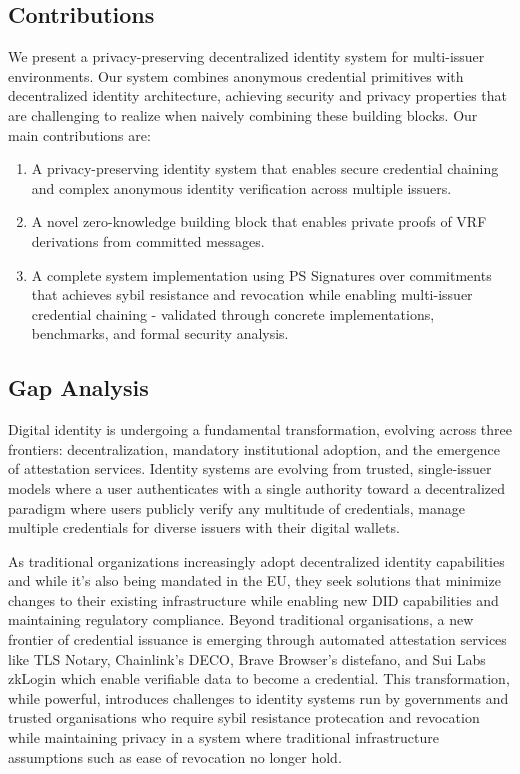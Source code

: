 \newpage

\subsection{Contributions}

We present a privacy-preserving decentralized identity system for multi-issuer environments. Our system combines anonymous credential primitives with decentralized identity architecture, achieving security and privacy properties that are challenging to realize when naively combining these building blocks. Our main contributions are:

\begin{enumerate}
    
    \item  A privacy-preserving identity system that enables secure credential chaining and complex anonymous identity verification across multiple issuers.

    \item A novel zero-knowledge building block that enables private proofs of VRF derivations from committed messages.
    
    \item  A complete system implementation using PS Signatures over commitments that achieves sybil resistance and revocation while enabling multi-issuer credential chaining - validated through concrete implementations, benchmarks, and formal security analysis.

\end{enumerate}

\subsection{Gap Analysis}

Digital identity is undergoing a fundamental transformation, evolving across three frontiers: decentralization, mandatory institutional adoption, and the emergence of attestation services.    
Identity systems are evolving from trusted, single-issuer models where a user authenticates with a single authority toward a decentralized paradigm where users publicly verify any multitude of credentials, manage multiple credentials for diverse issuers with their digital wallets.

\noindent As traditional organizations increasingly adopt decentralized identity capabilities and while it's also being mandated in the EU, they seek solutions that minimize changes to their existing infrastructure while enabling new DID capabilities and maintaining regulatory compliance. Beyond traditional organisations, a new frontier of credential issuance is emerging through automated attestation services like TLS Notary, Chainlink's DECO, Brave Browser's distefano, and Sui Labs zkLogin which enable verifiable data to become a credential. This transformation, while powerful, introduces challenges to identity systems run by governments and trusted organisations  who require sybil resistance protecation and revocation while maintaining privacy in a system where traditional infrastructure assumptions such as ease of revocation no longer hold.

